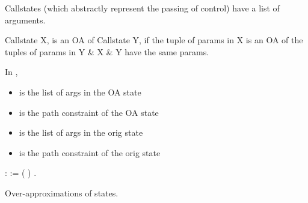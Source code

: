 \documentclass[12pt]{report}
\begin{document}
        Callstates (which abstractly
        represent the passing of control)
        have a list of arguments.


        Callstate X, is an OA of Callstate
        Y, if the tuple of params in X is
        an OA of the tuples of params in Y \&
        X \& Y have the same params.


        In     ,

\begin{itemize}
\item  {} is the list of args in the OA state

\item  {} is the path constraint of the OA state

\item  {} is the list of args in the orig state

\item  {} is the path constraint of the orig state

\end{itemize}
    
\begin{coqdoccode}
\coqdocindent{2.00em}
      :  :=\coqdoceol
\coqdocindent{3.00em}
 ( )    .\coqdoceol
\coqdocemptyline
\end{coqdoccode}
Over-approximations of states.


    
\end{document}
